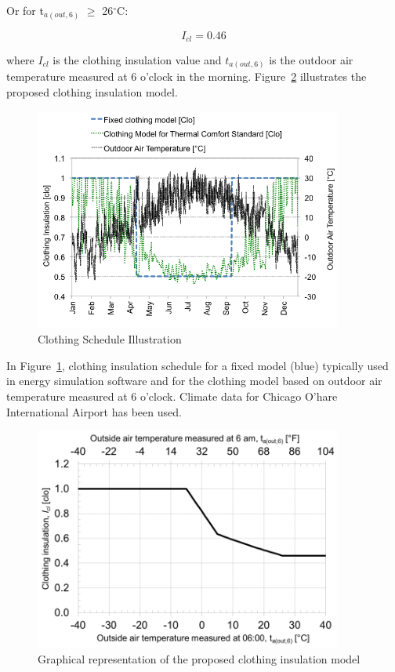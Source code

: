 Or for t\(_{a(out,6)}\) \(\geq\) 26\(^{\circ}\)C:

\begin{equation}
{I_{cl}} = 0.46
\end{equation}

where \(I_{cl}\) is the clothing insulation value and \(t_{a(out,6)}\) is the outdoor air temperature measured at 6 o'clock in the morning. Figure~\ref{fig:graphical-representation-of-the-proposed} illustrates the proposed clothing insulation model.

\begin{figure}[hbtp] %
\centering
\includegraphics[width=0.9\textwidth, height=0.9\textheight, keepaspectratio=true]{media/image6825.png}
\caption{Clothing Schedule Illustration \protect \label{fig:clothing-schedule-illustration}}
\end{figure}

In Figure~\ref{fig:clothing-schedule-illustration}, clothing insulation schedule for a fixed model (blue) typically used in energy simulation software and for the clothing model based on outdoor air temperature measured at 6 o'clock. Climate data for Chicago O'hare International Airport has been used.

\begin{figure}[hbtp] %
\centering
\includegraphics[width=0.9\textwidth, height=0.9\textheight, keepaspectratio=true]{media/image6826.png}
\caption{Graphical representation of the proposed clothing insulation model \protect \label{fig:graphical-representation-of-the-proposed}}
\end{figure}

